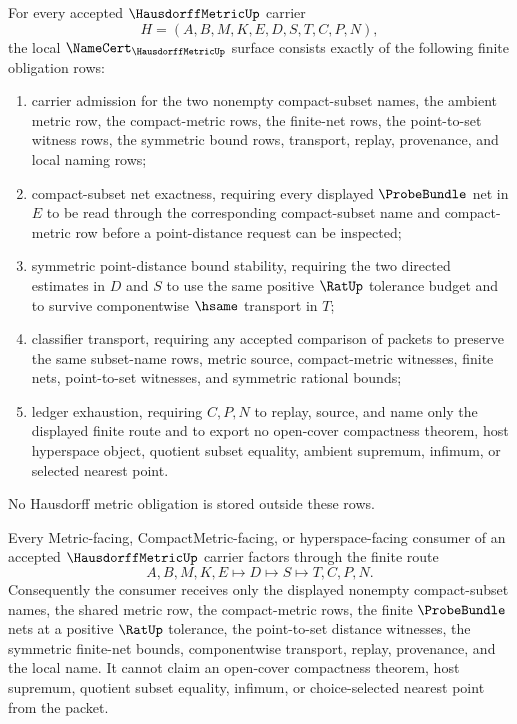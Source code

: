 \begin{theorem}
\label{thm:hausdorff-metric-namecert-obligations}
For every accepted $\HausdorffMetricUp$ carrier
$$
H=(A,B,M,K,E,D,S,T,C,P,N),
$$
the local $\NameCert_{\HausdorffMetricUp}$ surface consists exactly of the following finite obligation rows:
\begin{enumerate}
\item carrier admission for the two nonempty compact-subset names, the ambient metric row, the compact-metric rows, the finite-net rows, the point-to-set witness rows, the symmetric bound rows, transport, replay, provenance, and local naming rows;
\item compact-subset net exactness, requiring every displayed $\ProbeBundle$ net in $E$ to be read through the corresponding compact-subset name and compact-metric row before a point-distance request can be inspected;
\item symmetric point-distance bound stability, requiring the two directed estimates in $D$ and $S$ to use the same positive $\RatUp$ tolerance budget and to survive componentwise $\hsame$ transport in $T$;
\item classifier transport, requiring any accepted comparison of packets to preserve the same subset-name rows, metric source, compact-metric witnesses, finite nets, point-to-set witnesses, and symmetric rational bounds;
\item ledger exhaustion, requiring $C,P,N$ to replay, source, and name only the displayed finite route and to export no open-cover compactness theorem, host hyperspace object, quotient subset equality, ambient supremum, infimum, or selected nearest point.
\end{enumerate}
No Hausdorff metric obligation is stored outside these rows.
\end{theorem}

\begin{theorem}
\label{thm:hausdorff-metric-compact-subset-distance-bound}
Every Metric-facing, CompactMetric-facing, or hyperspace-facing consumer of an accepted $\HausdorffMetricUp$ carrier factors through the finite route
$$
A,B,M,K,E \longmapsto D \longmapsto S \longmapsto T,C,P,N .
$$
Consequently the consumer receives only the displayed nonempty compact-subset names, the shared metric row, the compact-metric rows, the finite $\ProbeBundle$ nets at a positive $\RatUp$ tolerance, the point-to-set distance witnesses, the symmetric finite-net bounds, componentwise transport, replay, provenance, and the local name. It cannot claim an open-cover compactness theorem, host supremum, quotient subset equality, infimum, or choice-selected nearest point from the packet.
\end{theorem}

